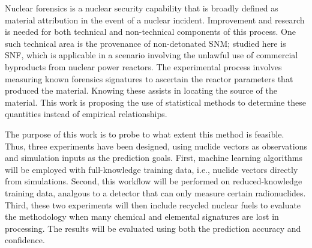 Nuclear forensics is a nuclear security capability that is broadly defined as
material attribution in the event of a nuclear incident.  Improvement and
research is needed for both technical and non-technical components of this
process.  One such technical area is the provenance of non-detonated \gls{SNM};
studied here is \gls{SNF}, which is applicable in a scenario involving the
unlawful use of commercial byproducts from nuclear power reactors.  The
experimental process involves measuring known forensics signatures to ascertain
the reactor parameters that produced the material. Knowing these assists in
locating the source of the material. This work is proposing the use of
statistical methods to determine these quantities instead of empirical
relationships. 

The purpose of this work is to probe to what extent this method is feasible.
Thus, three experiments have been designed, using nuclide vectors as
observations and simulation inputs as the prediction goals.  First, machine
learning algorithms will be employed with full-knowledge training data, i.e.,
nuclide vectors directly from simulations.  Second, this workflow will be
performed on reduced-knowledge training data, analgous to a detector that can
only measure certain radionuclides. Third, these two experiments will then
include recycled nuclear fuels to evaluate the methodology when many chemical
and elemental signatures are lost in processing. The results will be evaluated
using both the prediction accuracy and confidence.
